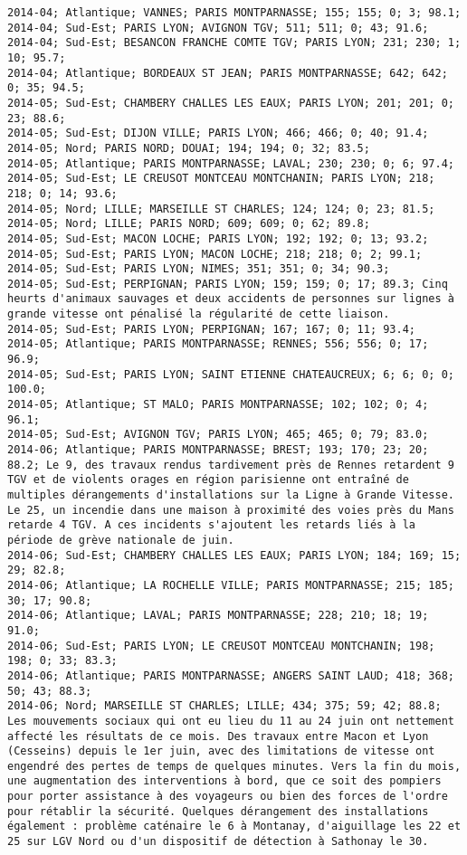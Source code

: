 \documentclass{article}
\begin{document}
\begin{Verbatim}[commandchars=\\\{\}]
2014-04; Atlantique; VANNES; PARIS MONTPARNASSE; 155; 155; 0; 3; 98.1; 
2014-04; Sud-Est; PARIS LYON; AVIGNON TGV; 511; 511; 0; 43; 91.6; 
2014-04; Sud-Est; BESANCON FRANCHE COMTE TGV; PARIS LYON; 231; 230; 1; 10; 95.7; 
2014-04; Atlantique; BORDEAUX ST JEAN; PARIS MONTPARNASSE; 642; 642; 0; 35; 94.5; 
2014-05; Sud-Est; CHAMBERY CHALLES LES EAUX; PARIS LYON; 201; 201; 0; 23; 88.6; 
2014-05; Sud-Est; DIJON VILLE; PARIS LYON; 466; 466; 0; 40; 91.4; 
2014-05; Nord; PARIS NORD; DOUAI; 194; 194; 0; 32; 83.5; 
2014-05; Atlantique; PARIS MONTPARNASSE; LAVAL; 230; 230; 0; 6; 97.4; 
2014-05; Sud-Est; LE CREUSOT MONTCEAU MONTCHANIN; PARIS LYON; 218; 218; 0; 14; 93.6; 
2014-05; Nord; LILLE; MARSEILLE ST CHARLES; 124; 124; 0; 23; 81.5; 
2014-05; Nord; LILLE; PARIS NORD; 609; 609; 0; 62; 89.8; 
2014-05; Sud-Est; MACON LOCHE; PARIS LYON; 192; 192; 0; 13; 93.2; 
2014-05; Sud-Est; PARIS LYON; MACON LOCHE; 218; 218; 0; 2; 99.1; 
2014-05; Sud-Est; PARIS LYON; NIMES; 351; 351; 0; 34; 90.3; 
2014-05; Sud-Est; PERPIGNAN; PARIS LYON; 159; 159; 0; 17; 89.3; Cinq heurts d'animaux sauvages et deux accidents de personnes sur lignes à grande vitesse ont pénalisé la régularité de cette liaison.
2014-05; Sud-Est; PARIS LYON; PERPIGNAN; 167; 167; 0; 11; 93.4; 
2014-05; Atlantique; PARIS MONTPARNASSE; RENNES; 556; 556; 0; 17; 96.9; 
2014-05; Sud-Est; PARIS LYON; SAINT ETIENNE CHATEAUCREUX; 6; 6; 0; 0; 100.0; 
2014-05; Atlantique; ST MALO; PARIS MONTPARNASSE; 102; 102; 0; 4; 96.1; 
2014-05; Sud-Est; AVIGNON TGV; PARIS LYON; 465; 465; 0; 79; 83.0; 
2014-06; Atlantique; PARIS MONTPARNASSE; BREST; 193; 170; 23; 20; 88.2; Le 9, des travaux rendus tardivement près de Rennes retardent 9 TGV et de violents orages en région parisienne ont entraîné de multiples dérangements d'installations sur la Ligne à Grande Vitesse. Le 25, un incendie dans une maison à proximité des voies près du Mans retarde 4 TGV. A ces incidents s'ajoutent les retards liés à la période de grève nationale de juin.
2014-06; Sud-Est; CHAMBERY CHALLES LES EAUX; PARIS LYON; 184; 169; 15; 29; 82.8; 
2014-06; Atlantique; LA ROCHELLE VILLE; PARIS MONTPARNASSE; 215; 185; 30; 17; 90.8; 
2014-06; Atlantique; LAVAL; PARIS MONTPARNASSE; 228; 210; 18; 19; 91.0; 
2014-06; Sud-Est; PARIS LYON; LE CREUSOT MONTCEAU MONTCHANIN; 198; 198; 0; 33; 83.3; 
2014-06; Atlantique; PARIS MONTPARNASSE; ANGERS SAINT LAUD; 418; 368; 50; 43; 88.3; 
2014-06; Nord; MARSEILLE ST CHARLES; LILLE; 434; 375; 59; 42; 88.8; Les mouvements sociaux qui ont eu lieu du 11 au 24 juin ont nettement affecté les résultats de ce mois. Des travaux entre Macon et Lyon (Cesseins) depuis le 1er juin, avec des limitations de vitesse ont engendré des pertes de temps de quelques minutes. Vers la fin du mois, une augmentation des interventions à bord, que ce soit des pompiers pour porter assistance à des voyageurs ou bien des forces de l'ordre pour rétablir la sécurité. Quelques dérangement des installations également : problème caténaire le 6 à Montanay, d'aiguillage les 22 et 25 sur LGV Nord ou d'un dispositif de détection à Sathonay le 30.

\end{Verbatim}
\end{document}
